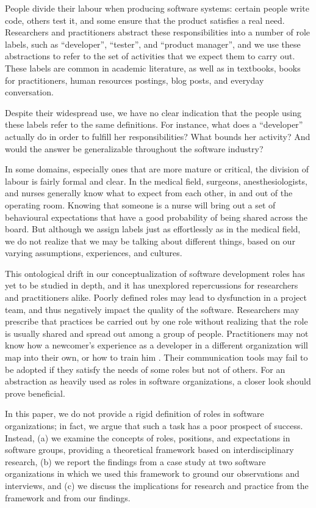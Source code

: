 \documentclass[10pt, conference, compsocconf]{IEEEtran}
\begin{document}
People divide their labour when producing software systems: certain people write code, others test it, and some ensure that the product satisfies a real need. Researchers and practitioners abstract these responsibilities into a number of role labels, such as ``developer'', ``tester'', and ``product manager'', and we use these abstractions to refer to the set of activities that we expect them to carry out. These labels are common in academic literature, as well as in textbooks, books for practitioners, human resources postings, blog posts, and everyday conversation.

Despite their widespread use, we have no clear indication that the people using these labels refer to the same definitions. For instance, what does a ``developer'' actually do in order to fulfill her responsibilities? What bounds her activity? And would the answer be generalizable throughout the software industry?

In some domains, especially ones that are more mature or critical, the division of labour is fairly formal and clear. In the medical field, surgeons, anesthesiologists, and nurses generally know what to expect from each other, in and out of the operating room. Knowing that someone is a nurse will bring out a set of behavioural expectations that have a good probability of being shared across the board. But although we assign labels just as effortlessly as in the medical field, we do not realize that we may be talking about different things, based on our varying assumptions, experiences, and cultures.

This ontological drift \cite{Robinson1991} in our conceptualization of software development roles has yet to be studied in depth, and it has unexplored repercussions for researchers and practitioners alike. Poorly defined roles may lead to dysfunction in a project team, and thus negatively impact the quality of the software. Researchers may prescribe that practices be carried out by one role without realizing that the role is usually shared and spread out among a group of people. Practitioners may not know how a newcomer's experience as a developer in a different organization will map into their own, or how to train him \cite{Dagenais2010}. Their communication tools may fail to be adopted if they satisfy the needs of some roles but not of others. For an abstraction as heavily used as roles in software organizations, a closer look should prove beneficial.

In this paper, we do not provide a rigid definition of roles in software organizations; in fact, we argue that such a task has a poor prospect of success. Instead, (a) we examine the concepts of roles, positions, and expectations in software groups, providing a theoretical framework based on interdisciplinary research, (b) we report the findings from a case study at two software organizations in which we used this framework to ground our observations and interviews, and (c) we discuss the implications for research and practice from the framework and from our findings.
\end{document}
